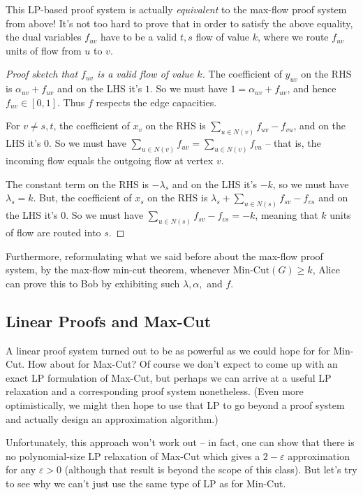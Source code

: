 \documentclass[11pt]{article}
\renewcommand{\epsilon}{\varepsilon}
\newcommand{\eps}{\epsilon}
\begin{document}
This LP-based proof system is actually \emph{equivalent} to the max-flow proof system from above!
It's not too hard to prove that in order to satisfy the above equality, the dual variables $f_{uv}$ have to be a valid $t,s$ flow of value $k$, where we route $f_{uv}$ units of flow from $u$ to $v$.
\begin{proof}[Proof sketch that $f_{uv}$ is a valid flow of value $k$]
    The coefficient of $y_{uv}$ on the RHS is $\alpha_{uv} + f_{uv}$ and on the LHS it's $1$.
    So we must have $1 = \alpha_{uv} + f_{uv}$, and hence $f_{uv} \in [0,1]$.
    Thus $f$ respects the edge capacities.
    
    For $v \neq s,t$, the coefficient of $x_v$ on the RHS is $\sum_{u \in N(v)} f_{uv} - f_{vu}$, and on the LHS it's $0$.
    So we must have $\sum_{u \in N(v)} f_{uv} = \sum_{u \in N(v)} f_{vu}$ -- that is, the incoming flow equals the outgoing flow at vertex $v$.

    The constant term on the RHS is $-\lambda_s$ and on the LHS it's $-k$, so we must have $\lambda_s = k$.
    But, the coefficient of $x_s$ on the RHS is $\lambda_s + \sum_{u \in N(s)} f_{sv} - f_{vs}$ and on the LHS it's $0$.
    So we must have $\sum_{u \in N(s)} f_{sv} - f_{vs} = -k$, meaning that $k$ units of flow are routed into $s$.
\end{proof}

Furthermore, reformulating what we said before about the max-flow proof system, by the max-flow min-cut theorem, whenever $\text{Min-Cut}(G) \geq k$, Alice can prove this to Bob by exhibiting such $\lambda, \alpha,$ and $f$.

\subsection{Linear Proofs and Max-Cut}
A linear proof system turned out to be as powerful as we could hope for for Min-Cut.
How about for Max-Cut?
Of course we don't expect to come up with an exact LP formulation of Max-Cut, but perhaps we can arrive at a useful LP relaxation and a corresponding proof system nonetheless.
(Even more optimistically, we might then hope to use that LP to go beyond a proof system and actually design an approximation algorithm.)

Unfortunately, this approach won't work out -- in fact, one can show that there is no polynomial-size LP relaxation of Max-Cut which gives a $2-\eps$ approximation for any $\eps > 0$ (although that result is beyond the scope of this class).
But let's try to see why we can't just use the same type of LP as for Min-Cut.
\end{document}
